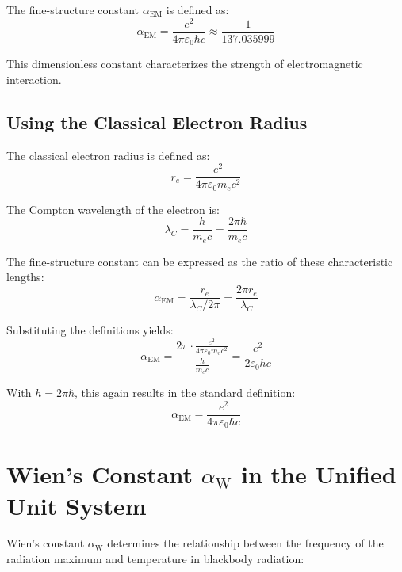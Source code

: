 \documentclass[12pt,a4paper]{article}
\newcommand{\alphaEM}{\alpha_{\text{EM}}}
\newcommand{\alphaW}{\alpha_{\text{W}}}
\begin{document}
	The fine-structure constant \(\alphaEM\) is defined as:
	\begin{equation}
		\alphaEM = \frac{e^2}{4\pi \varepsilon_0 \hbar c} \approx \frac{1}{137.035999}
	\end{equation}
	
	This dimensionless constant characterizes the strength of electromagnetic interaction.
	
	\subsection{Using the Classical Electron Radius}
	\label{subsec:electron_radius}
	
	The classical electron radius is defined as:
	\begin{equation}
		r_e = \frac{e^2}{4\pi \varepsilon_0 m_e c^2}
	\end{equation}
	
	The Compton wavelength of the electron is:
	\begin{equation}
		\lambda_C = \frac{h}{m_e c} = \frac{2\pi\hbar}{m_e c}
	\end{equation}
	
	The fine-structure constant can be expressed as the ratio of these characteristic lengths:
	\begin{equation}
		\alphaEM = \frac{r_e}{\lambda_C/2\pi} = \frac{2\pi r_e}{\lambda_C}
	\end{equation}
	
	Substituting the definitions yields:
	\begin{equation}
		\alphaEM = \frac{2\pi \cdot \frac{e^2}{4\pi \varepsilon_0 m_e c^2}}{\frac{h}{m_e c}} = \frac{e^2}{2\varepsilon_0 h c}
	\end{equation}
	
	With \(h = 2\pi\hbar\), this again results in the standard definition:
	\begin{equation}
		\alphaEM = \frac{e^2}{4\pi \varepsilon_0 \hbar c}
	\end{equation}
	
	\section{Wien's Constant \(\alphaW\) in the Unified Unit System}
	\label{sec:wien_constant}
	
	Wien's constant \(\alphaW\) determines the relationship between the frequency of the radiation maximum and temperature in blackbody radiation:
	
\end{document}
